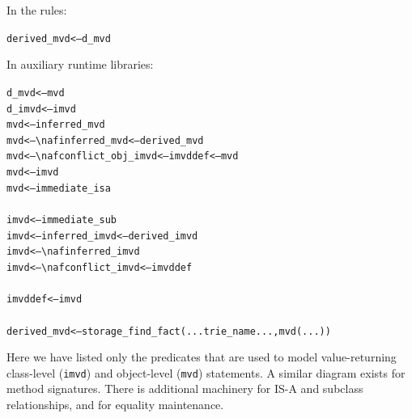 \documentclass[11pt]{article}
\newcommand{\bs}{\textbackslash}
\newcommand{\RULELOGNAF}{{\texttt{{\bs}naf}}\xspace}
\begin{document}
{\noindent
In the rules:
\begin{alltt}
derived\_mvd <--- d\_mvd  
\end{alltt}
\noindent
In auxiliary runtime libraries:
\begin{alltt}
d\_mvd  <---  mvd \\
d\_imvd <--- imvd \\
          mvd <---      inferred\_mvd \\
          mvd <--- \RULELOGNAF inferred\_mvd        <--- derived\_mvd \\
          mvd <--- \RULELOGNAF conflict\_obj\_imvd   <--- imvddef <--- mvd \\
          mvd <---      imvd \\
          mvd <---      immediate\_isa \\
 \\
         imvd <---      immediate\_sub \\
         imvd <---      inferred\_imvd             <--- derived\_imvd \\
         imvd <--- \RULELOGNAF inferred\_imvd \\
         imvd <--- \RULELOGNAF conflict\_imvd      <--- imvddef \\
 \\
      imvddef <---      imvd \\
 \\
  derived\_mvd <--- storage\_find\_fact(...trie\_name..., mvd(...))
\end{alltt}
Here we have listed only the predicates that are used to model value-returning
class-level ({\tt imvd}) and object-level ({\tt mvd}) statements.  A similar
diagram exists for
method signatures. There is additional machinery for
IS-A and subclass relationships, and for equality maintenance.

}
\end{document}
